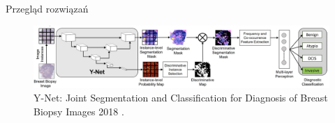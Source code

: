 \documentclass[10pt]{beamer}
\begin{document}
            \begin{frame}{Przegląd rozwiązań}
                
                \begin{figure}
                    \includegraphics[width=\textwidth]{images/y-net.png}
                    \caption{Y-Net: Joint Segmentation and Classification for Diagnosis of Breast Biopsy Images 2018 \cite{mehta2018net}.}
                \end{figure}
            \end{frame}
            
\end{document}
